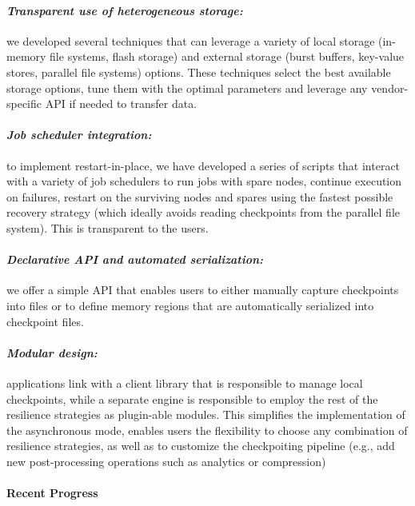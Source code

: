 \paragraph{\emph{Transparent use of heterogeneous storage:}} we
developed several techniques that can leverage a variety of local
storage (in-memory file systems, flash storage) and external storage
(burst buffers, key-value stores, parallel file systems)
options. These techniques select the best available storage options,
tune them with the optimal parameters and leverage any vendor-specific
API if needed to transfer data.
\vspace{-1em}

\paragraph{\emph{Job scheduler integration:}} to implement
restart-in-place, we have developed a series of scripts that interact
with a variety of job schedulers to run jobs with spare nodes,
continue execution on failures, restart on the surviving nodes and
spares using the fastest possible recovery strategy (which ideally
avoids reading checkpoints from the parallel file system). This is
transparent to the users.
\vspace{-1em}

\paragraph{\emph{Declarative API and automated serialization:}} we
offer a simple API that enables users to either manually capture
checkpoints into files or to define memory regions that are
automatically serialized into checkpoint files.
\vspace{-1em}

\paragraph{\emph{Modular design:}} applications link with a client
library that is responsible to manage local checkpoints, while a
separate engine is responsible to employ the rest of the resilience
strategies as plugin-able modules. This simplifies the implementation
of the asynchronous mode, enables users the flexibility to choose any
combination of resilience strategies, as well as to customize the
checkpoiting pipeline (e.g., add new post-processing operations such
as analytics or compression)

\paragraph{Recent Progress}

